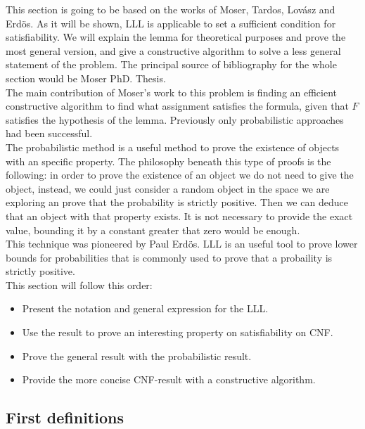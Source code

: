 
 
This section is going to be based on the works of Moser, Tardos, Lovász and Erdös. As it will be shown, LLL is applicable to set a sufficient condition for satisfiability.  We will explain the lemma for theoretical purposes and prove the most general version, and give a constructive algorithm to solve a less general statement of the problem. The principal source of bibliography for the whole section would be Moser PhD. Thesis\cite{moser2009constructive}. \\ 


The main contribution of Moser's work to this problem is finding an efficient constructive algorithm to find what assignment satisfies the formula, given that $F$ satisfies the hypothesis of the lemma. Previously only probabilistic approaches had been successful.\\


The probabilistic method is a useful method to prove the existence of objects with an specific property. The philosophy beneath this type of proofs is the following: in order to prove the existence of an object we do not need to give the object, instead, we could just consider a random object in the space we are exploring an prove that the probability is strictly positive. Then we can deduce that an object with that property exists. It is not necessary to provide the exact value, bounding it by a constant greater that zero would be enough. \\

This technique was pioneered by Paul Erdös. LLL is an useful tool to prove lower bounds for probabilities that is commonly used to prove that a probaility is strictly positive.\\

This section will follow this order:
\begin{itemize}
	\item Present the notation and general expression for the LLL.
	\item Use the result to prove an interesting property on satisfiability on CNF.
	\item Prove the general result with the probabilistic result.
	\item Provide the more concise CNF-result with a constructive algorithm.
\end{itemize}


\subsection{First definitions}

